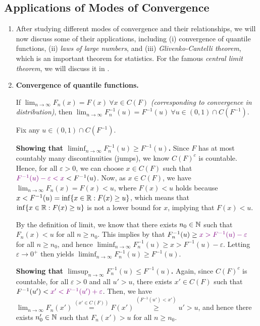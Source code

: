 \subsection{Applications of Modes of Convergence}
\begin{enumerate}
\item After studying different modes of convergence and their relationships, we
will now discuss some of their applications, including (i) convergence of
quantile functions, (ii) \emph{laws of large numbers}, and (iii)
\emph{Glivenko-Cantelli theorem}, which is an important theorem for statistics.
For the famous \emph{central limit theorem}, we will discuss it in
.
\item \textbf{Convergence of quantile functions.}
\begin{proposition}
\label{prp:conv-quant-fun}
If \(\lim_{n\to\infty}F_n(x)=F(x)~\forall x\in C(F)\) \emph{(corresponding to
convergence in distribution)}, then
\(\lim_{n\to\infty}F_n^{-1}(u)=F^{-1}(u)~\forall u\in (0,1)\cap C(F^{-1})\).
\end{proposition}
\begin{pf}
Fix any \(u\in (0,1)\cap C(F^{-1})\).

\textbf{Showing that \(\liminf_{n\to \infty}F_n^{-1}(u)\ge F^{-1}(u)\).} Since
\(F\) has at most countably many discontinuities (jumps), we know \(C(F)^{c}\)
is countable. Hence, for all \(\varepsilon>0\), we can choose \(x\in C(F)\)
such that \(\vc{F^{-1}(u)-\varepsilon<x}<F^{-1}(u)\). Now, as \(x\in C(F)\), we have
\(\lim_{n\to\infty}F_n(x)=F(x)<u\), where \(F(x)<u\) holds because \(x<F^{-1}(u)=
\inf\{x\in\mathbb{R}:F(x)\ge u\}\), which means that \(\inf\{x\in\mathbb{R}:F(x)\ge u\}\) is
not a lower bound for \(x\), implying that \(F(x)<u\).

By the definition of limit, we know that there exists \(n_0\in\mathbb{N}\) such that
\(F_n(x)<u\) for all \(n\ge n_0\). This implies by 
that \(F_{n}^{-1}(u)\ge \vc{x>F^{-1}(u)-\varepsilon}\) for all \(n\ge n_0\), and
hence \(\liminf_{n\to \infty}F_n^{-1}(u)\ge x>F^{-1}(u)-\varepsilon\). Letting
\(\varepsilon\to 0^{+}\) then yields \(\liminf_{n\to \infty}F_{n}^{-1}(u)\ge
F^{-1}(u)\).

\textbf{Showing that \(\limsup_{n\to \infty}F_n^{-1}(u)\le F^{-1}(u)\).}
Again, since \(C(F)^{c}\) is countable, for all \(\varepsilon>0\) and all
\(u'>u\), there exists \(x'\in C(F)\) such that \(F^{-1}(u')<\vc{x'<F^{-1}(u')+\varepsilon}\).
Then, we have \(\lim_{n\to\infty}F_n(x')\overset{(x'\in C(F))}{=}F(x')
\overset{(F^{-1}(u')<x')}{\ge}u'>u\), and hence there exists \(n_0'\in\mathbb{N}\) such
that \(F_n(x')>u\) for all \(n\ge n_0\). 


\end{pf}
\end{enumerate}
